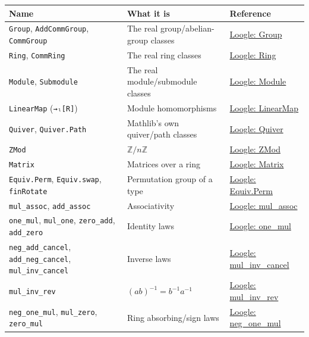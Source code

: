 {\small\begin{tabular}{
  >{\raggedright\arraybackslash}p{}
  >{\raggedright\arraybackslash}p{}
  >{\raggedright\arraybackslash}p{}
}
\toprule
Name & What it is & Reference \\
\midrule
\texttt{Group}, \texttt{AddCommGroup}, \texttt{CommGroup} & The real group/abelian-group classes & \href{https://loogle.lean-lang.org/?q=Group}{Loogle: Group} \\
\texttt{Ring}, \texttt{CommRing} & The real ring classes & \href{https://loogle.lean-lang.org/?q=Ring}{Loogle: Ring} \\
\texttt{Module}, \texttt{Submodule} & The real module/submodule classes & \href{https://loogle.lean-lang.org/?q=Module}{Loogle: Module} \\
\texttt{LinearMap} (\texttt{→ₗ[R]}) & Module homomorphisms & \href{https://loogle.lean-lang.org/?q=LinearMap}{Loogle: LinearMap} \\
\texttt{Quiver}, \texttt{Quiver.Path} & Mathlib's own quiver/path classes & \href{https://loogle.lean-lang.org/?q=Quiver}{Loogle: Quiver} \\
\texttt{ZMod} & \(\mathbb{Z}/n\mathbb{Z}\) & \href{https://loogle.lean-lang.org/?q=ZMod}{Loogle: ZMod} \\
\texttt{Matrix} & Matrices over a ring & \href{https://loogle.lean-lang.org/?q=Matrix}{Loogle: Matrix} \\
\texttt{Equiv.Perm}, \texttt{Equiv.swap}, \texttt{finRotate} & Permutation group of a type & \href{https://loogle.lean-lang.org/?q=Equiv.Perm}{Loogle: Equiv.Perm} \\
\texttt{mul\_assoc}, \texttt{add\_assoc} & Associativity & \href{https://loogle.lean-lang.org/?q=mul_assoc}{Loogle: mul\_assoc} \\
\texttt{one\_mul}, \texttt{mul\_one}, \texttt{zero\_add}, \texttt{add\_zero} & Identity laws & \href{https://loogle.lean-lang.org/?q=one_mul}{Loogle: one\_mul} \\
\texttt{neg\_add\_cancel}, \texttt{add\_neg\_cancel}, \texttt{mul\_inv\_cancel} & Inverse laws & \href{https://loogle.lean-lang.org/?q=mul_inv_cancel}{Loogle: mul\_inv\_cancel} \\
\texttt{mul\_inv\_rev} & \((ab)^{-1}=b^{-1}a^{-1}\) & \href{https://loogle.lean-lang.org/?q=mul_inv_rev}{Loogle: mul\_inv\_rev} \\
\texttt{neg\_one\_mul}, \texttt{mul\_zero}, \texttt{zero\_mul} & Ring absorbing/sign laws & \href{https://loogle.lean-lang.org/?q=neg_one_mul}{Loogle: neg\_one\_mul} \\

\end{tabular}}
